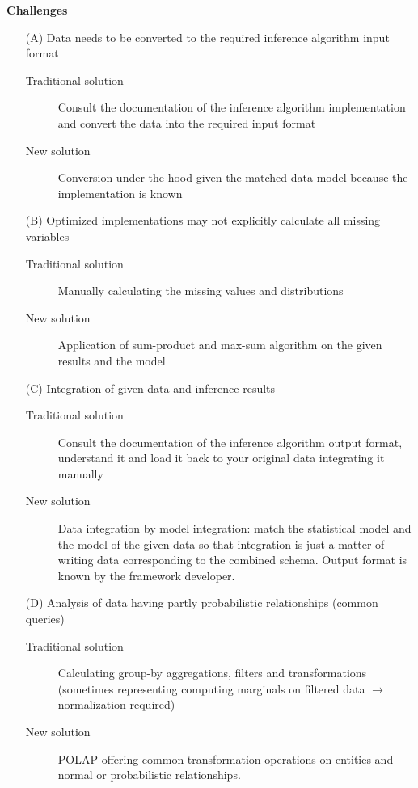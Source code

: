 \textbf{Challenges}
\begin{enumerate}
\item[(A)] Data needs to be converted to the required inference algorithm input format
	\begin{description}
	\item[Traditional solution] Consult the documentation of the inference algorithm implementation and convert the data into the required input format
	\item[New solution] Conversion under the hood given the matched data model because the implementation is known
	\end{description}
\item[(B)] Optimized implementations may not explicitly calculate all missing variables
	\begin{description}
	\item[Traditional solution] Manually calculating the missing values and distributions
	\item[New solution] Application of sum-product and max-sum algorithm on the given results and the model
	\end{description}
\item[(C)] Integration of given data and inference results
	\begin{description}
	\item[Traditional solution] Consult the documentation of the inference algorithm output format, understand it and load it back to your original data integrating it manually
	\item[New solution] Data integration by model integration: match the statistical model and the model of the given data so that integration is just a matter of writing data corresponding to the combined schema. Output format is known by the framework developer.
	\end{description}
\item[(D)] Analysis of data having partly probabilistic relationships (common queries)
	\begin{description}
	\item[Traditional solution] Calculating group-by aggregations, filters and transformations (sometimes representing computing marginals on filtered data $\rightarrow$ normalization required)
	\item[New solution] POLAP offering common transformation operations on entities and normal or probabilistic relationships.
	\end{description}
\end{enumerate}
